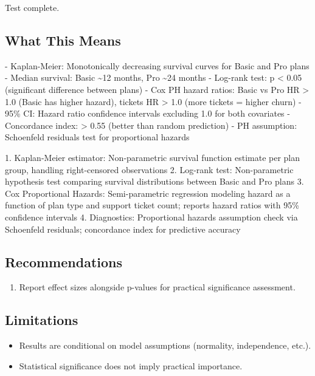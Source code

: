 \documentclass[11pt, a4paper]{article}
\begin{document}
\begin{polyainsight}[title={Bottom Line}]
Test complete.
\end{polyainsight}

\subsection{What This Means}

- Kaplan-Meier: Monotonically decreasing survival curves for Basic and Pro plans
- Median survival: Basic \textasciitilde{}12 months, Pro \textasciitilde{}24 months
- Log-rank test: p < 0.05 (significant difference between plans)
- Cox PH hazard ratios: Basic vs Pro HR > 1.0 (Basic has higher hazard), tickets HR > 1.0 (more tickets = higher churn)
- 95\% CI: Hazard ratio confidence intervals excluding 1.0 for both covariates
- Concordance index: > 0.55 (better than random prediction)
- PH assumption: Schoenfeld residuals test for proportional hazards

1. Kaplan-Meier estimator: Non-parametric survival function estimate per plan group, handling right-censored observations
2. Log-rank test: Non-parametric hypothesis test comparing survival distributions between Basic and Pro plans
3. Cox Proportional Hazards: Semi-parametric regression modeling hazard as a function of plan type and support ticket count; reports hazard ratios with 95\% confidence intervals
4. Diagnostics: Proportional hazards assumption check via Schoenfeld residuals; concordance index for predictive accuracy



\subsection{Recommendations}

\begin{enumerate}
  \item Report effect sizes alongside p-values for practical significance assessment.
\end{enumerate}

\subsection{Limitations}

\begin{polyawarnbox}
\begin{itemize}
  \item Results are conditional on model assumptions (normality, independence, etc.).
  \item Statistical significance does not imply practical importance.
\end{itemize}
\end{polyawarnbox}

\end{document}
